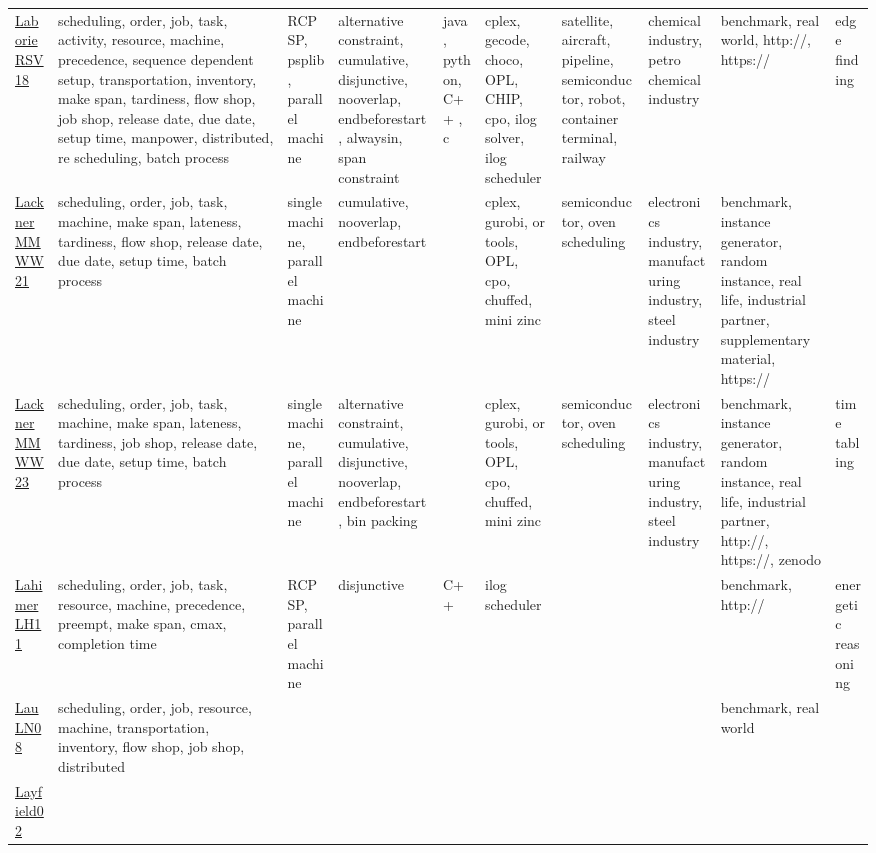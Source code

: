 {\begin{longtable}{p{3cm}p{4cm}p{2cm}p{2cm}p{2cm}p{2cm}p{2cm}p{2cm}p{2cm}p{2cm}}
\href{articles/LaborieRSV18.pdf}{LaborieRSV18}~\cite{LaborieRSV18} & scheduling, order, job, task, activity, resource, machine, precedence, sequence dependent setup, transportation, inventory, make span, tardiness, flow shop, job shop, release date, due date, setup time, manpower, distributed, re scheduling, batch process & RCPSP, psplib, parallel machine & alternative constraint, cumulative, disjunctive, nooverlap, endbeforestart, alwaysin, span constraint & java , python,  C++ , c  & cplex, gecode, choco, OPL, CHIP, cpo, ilog solver, ilog scheduler & satellite, aircraft, pipeline, semiconductor, robot, container terminal, railway & chemical industry, petro chemical industry & benchmark, real world, http://, https:// & edge finding\\
\href{papers/LacknerMMWW21.pdf}{LacknerMMWW21}~\cite{LacknerMMWW21} & scheduling, order, job, task, machine, make span, lateness, tardiness, flow shop, release date, due date, setup time, batch process & single machine, parallel machine & cumulative, nooverlap, endbeforestart &  & cplex, gurobi, or tools, OPL, cpo, chuffed, mini zinc & semiconductor, oven scheduling & electronics industry, manufacturing industry, steel industry & benchmark, instance generator, random instance, real life, industrial partner, supplementary material, https:// & \\
\href{articles/LacknerMMWW23.pdf}{LacknerMMWW23}~\cite{LacknerMMWW23} & scheduling, order, job, task, machine, make span, lateness, tardiness, job shop, release date, due date, setup time, batch process & single machine, parallel machine & alternative constraint, cumulative, disjunctive, nooverlap, endbeforestart, bin packing &  & cplex, gurobi, or tools, OPL, cpo, chuffed, mini zinc & semiconductor, oven scheduling & electronics industry, manufacturing industry, steel industry & benchmark, instance generator, random instance, real life, industrial partner, http://, https://, zenodo & time tabling\\
\href{papers/LahimerLH11.pdf}{LahimerLH11}~\cite{LahimerLH11} & scheduling, order, job, task, resource, machine, precedence, preempt, make span, cmax, completion time & RCPSP, parallel machine & disjunctive &  C++  & ilog scheduler &  &  & benchmark, http:// & energetic reasoning\\
\href{papers/LauLN08.pdf}{LauLN08}~\cite{LauLN08} & scheduling, order, job, resource, machine, transportation, inventory, flow shop, job shop, distributed &  &  &  &  &  &  & benchmark, real world & \\
\href{}{Layfield02}~\cite{Layfield02} &  &  &  &  &  &  &  &  & \\

\end{longtable}}
